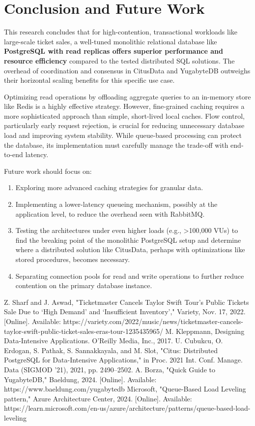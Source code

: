 \documentclass{ieeeaccess}
\begin{document}
\section{Conclusion and Future Work}
\label{sec:conclusion}
This research concludes that for high-contention, transactional workloads like large-scale ticket sales, a well-tuned monolithic relational database like \textbf{PostgreSQL with read replicas offers superior performance and resource efficiency} compared to the tested distributed SQL solutions. The overhead of coordination and consensus in CitusData and YugabyteDB outweighs their horizontal scaling benefits for this specific use case.

Optimizing read operations by offloading aggregate queries to an in-memory store like Redis is a highly effective strategy. However, fine-grained caching requires a more sophisticated approach than simple, short-lived local caches. Flow control, particularly early request rejection, is crucial for reducing unnecessary database load and improving system stability. While queue-based processing can protect the database, its implementation must carefully manage the trade-off with end-to-end latency.

Future work should focus on:
\begin{enumerate}
\item Exploring more advanced caching strategies for granular data.
\item Implementing a lower-latency queueing mechanism, possibly at the application level, to reduce the overhead seen with RabbitMQ.
\item Testing the architectures under even higher loads (e.g., >100,000 VUs) to find the breaking point of the monolithic PostgreSQL setup and determine where a distributed solution like CitusData, perhaps with optimizations like stored procedures, becomes necessary.
\item Separating connection pools for read and write operations to further reduce contention on the primary database instance.
\end{enumerate}

\begin{thebibliography}{00}
 Z. Sharf and J. Aswad, "Ticketmaster Cancels Taylor Swift Tour’s Public Tickets Sale Due to ‘High Demand’ and ‘Insufficient Inventory’," Variety, Nov. 17, 2022. [Online]. Available: https://variety.com/2022/music/news/ticketmaster-cancels-taylor-swift-public-ticket-sales-eras-tour-1235435965/
 M. Kleppmann, Designing Data-Intensive Applications. O'Reilly Media, Inc., 2017.
 U. Cubukcu, O. Erdogan, S. Pathak, S. Sannakkayala, and M. Slot, "Citus: Distributed PostgreSQL for Data-Intensive Applications," in Proc. 2021 Int. Conf. Manage. Data (SIGMOD '21), 2021, pp. 2490–2502.
 A. Borza, "Quick Guide to YugabyteDB," Baeldung, 2024. [Online]. Available: https://www.baeldung.com/yugabytedb
 Microsoft, "Queue-Based Load Leveling pattern," Azure Architecture Center, 2024. [Online]. Available: https://learn.microsoft.com/en-us/azure/architecture/patterns/queue-based-load-leveling
\end{thebibliography}
\end{document}
